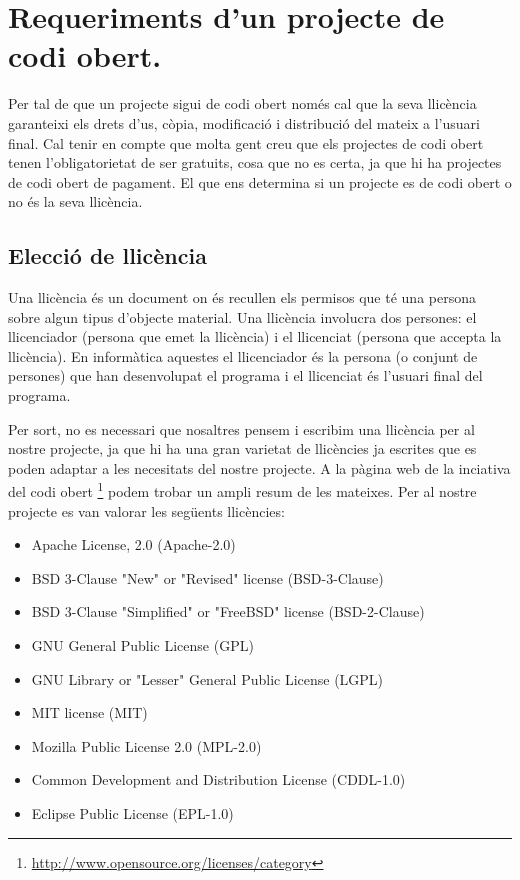 \section{Requeriments d'un projecte de codi obert.}

Per tal de que un projecte sigui de codi obert només cal que la seva llicència garanteixi els drets  d'us, còpia,  modificació i distribució del mateix a l'usuari final. Cal tenir en compte que molta gent creu que els projectes de codi obert tenen l'obligatorietat de ser gratuits, cosa que no es certa, ja que hi ha projectes de codi obert de pagament. El que ens determina si un projecte es de codi obert o no és la seva llicència. 

\subsection{Elecció de llicència}

Una llicència és un document on és recullen els permisos que té una persona sobre algun tipus d'objecte material. Una llicència involucra dos persones: el llicenciador (persona que emet la llicència) i el llicenciat (persona que accepta la llicència). En informàtica aquestes el llicenciador és la persona (o conjunt de persones) que han desenvolupat el programa i el llicenciat és l'usuari final del programa. 

Per sort, no es necessari que nosaltres pensem i escribim una llicència per al nostre projecte, ja que hi ha una gran varietat de llicències ja escrites que es poden adaptar a les necesitats del nostre projecte. A la pàgina web de la inciativa del codi obert \footnote{\url{http://www.opensource.org/licenses/category}} podem trobar un ampli resum de les mateixes. Per al nostre projecte es van valorar les següents llicències: 

\begin{itemize}
\item{Apache License, 2.0 (Apache-2.0)}
\item{BSD 3-Clause "New" or "Revised" license (BSD-3-Clause)}
\item{BSD 3-Clause "Simplified" or "FreeBSD" license (BSD-2-Clause)}
\item{GNU General Public License (GPL)}
\item{GNU Library or "Lesser" General Public License (LGPL)}
\item{MIT license (MIT)}
\item{Mozilla Public License 2.0 (MPL-2.0)}
\item{Common Development and Distribution License (CDDL-1.0)}
\item{Eclipse Public License (EPL-1.0)}
\end{itemize}


